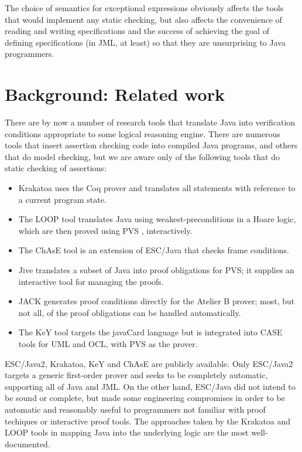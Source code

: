 \documentclass{sig-alternate}
\begin{document}
The choice of semantics for exceptional expressions obviously affects the tools that would
implement any static checking, but also affects the convenience of reading and 
writing specifications and the success of achieving the goal of defining specifications (in JML, 
at least) so that they are unsurprising to Java programmers. 

\section{Background: Related work}

There are by now a number of research tools that translate Java into verification conditions
appropriate to some logical reasoning engine.  There are numerous tools that insert
assertion checking code into compiled Java programs, and others that do model checking,
but
we are aware only of the following tools that do static
checking of assertions:
\setlength{\partopsep}{0in}\setlength{\parskip}{0in}\setlength{\itemsep}{0in}\setlength{\topsep}{0in}
\begin{itemize}
\setlength{\partopsep}{0in}\setlength{\parskip}{0in}\setlength{\itemsep}{0in}\setlength{\topsep}{0in}
\item Krakatoa \cite{krakatoa03a} uses the Coq prover and 
translates all statements with reference to a current program state. 
\item The LOOP tool \cite{Jacobs04,JacobsPoll01a}
 translates Java using weakest-preconditions in a Hoare logic,
which are then proved using PVS \cite{OwreRRSS96}, interactively.  
\item The ChAsE tool \cite{CH03} is an extension of ESC/Java that checks frame conditions.
\item Jive \cite{MeyerMuellerPoetzsch-Heffter00} translates a subset of Java into proof
obligations for PVS; it supplies an interactive tool for managing the proofs.
\item JACK \cite{JACK} generates proof conditions directly for the Atelier B prover; 
most, but not all, of
the proof obligations can be handled automatically. 
\item The KeY tool \cite{Key2003} targets the javaCard language but is integrated into CASE 
tools for UML and OCL, with PVS as the prover.
\end{itemize}

ESC/Java2, Krakatoa, KeY and ChAsE are publicly available.  Only ESC/Java2 targets a
generic first-order prover and seeks to be completely automatic, supporting all of Java and JML.
  On the other hand, ESC/Java
did not intend to be sound or complete, but made some engineering compromises in order to
be automatic and reasonably useful to programmers not familiar with proof techiques or
interactive proof tools.  The approaches taken by the Krakatoa and LOOP tools in mapping
Java into the underlying logic are the most well-documented.
\end{document}
